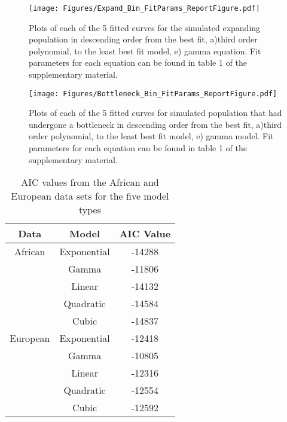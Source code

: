 \documentclass[11pt]{article}
\begin{document}
\begin{linenumbers}
\begin{figure}[htp]
\begin{center}
\texttt{[image: Figures/Expand\_Bin\_FitParams\_ReportFigure.pdf]}
\caption{\small Plots of each of the 5 fitted curves for the simulated expanding population in descending order from the best fit, a)third order polynomial, to the least best fit model, e) gamma equation. Fit parameters for each equation can be found in table 1 of the supplementary material.}
\end{center}
\end{figure}

\begin{figure}[htp]
\begin{center}
\texttt{[image: Figures/Bottleneck\_Bin\_FitParams\_ReportFigure.pdf]}
\caption{\small Plots of each of the 5 fitted curves for simulated population that had undergone a bottleneck in descending order from the best fit, a)third order polynomial, to the least best fit model, e) gamma model. Fit parameters for each equation can be found in table 1 of the supplementary material.}
\end{center}
\end{figure}

\begin{table}[htp]
\centering
\caption{AIC values from the African and European data sets for the five model types}
\label{table:1}
\begin{tabular}{c  c  c}
\hline
Data     & Model       & AIC Value \\
\hline
African  & Exponential & -14288    \\
         & Gamma       & -11806    \\
         & Linear      & -14132    \\
         & Quadratic   & -14584    \\
         & Cubic       & -14837    \\
\hline         
European & Exponential & -12418    \\
         & Gamma       & -10805    \\
         & Linear      & -12316    \\
         & Quadratic   & -12554    \\
         & Cubic       & -12592    \\
\hline

\end{tabular}
\end{table}


\end{linenumbers}
\end{document}
